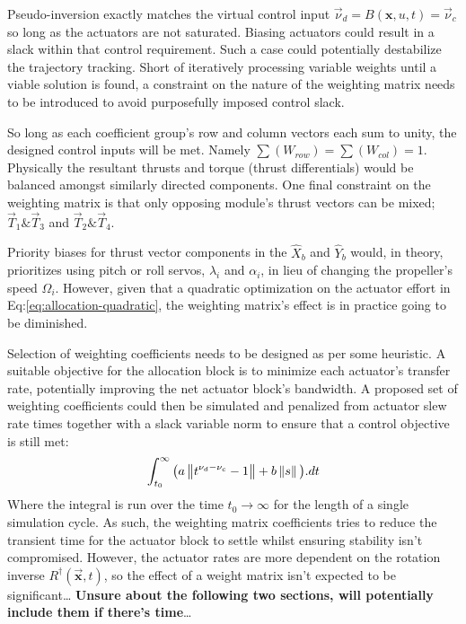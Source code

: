 \par
Pseudo-inversion exactly matches the virtual control input $\vec{\nu}_d=B(\mathbf{x},u,t)=\vec{\nu}_c$ so long as the actuators are not saturated. Biasing actuators could result in a slack within that control requirement. Such a case could potentially destabilize the trajectory tracking. Short of iteratively processing variable weights until a viable solution is found, a constraint on the nature of the weighting matrix needs to be introduced to avoid purposefully imposed control slack.
\par
So long as each coefficient group's row and column vectors each sum to unity, the designed control inputs will be met. Namely $\sum (W_{row})=\sum (W_{col}) = 1$. Physically the resultant thrusts and torque (thrust differentials) would be balanced amongst similarly directed components. One final constraint on the weighting matrix is that only opposing module's thrust vectors can be mixed; $\vec{T}_1\text{\&}\vec{T}_3$ and $\vec{T}_2\text{\&}\vec{T}_4$.
\par
Priority biases for thrust vector components in the $\hat{X}_{b}$ and $\hat{Y}_{b}$ would, in theory, prioritizes using pitch or roll servos, $\lambda_i$ and $\alpha_i$, in lieu of changing the propeller's speed $\Omega_i$. However, given that a quadratic optimization on the actuator effort in Eq:\ref{eq:allocation-quadratic}, the weighting matrix's effect is in practice going to be diminished.
\par
Selection of weighting coefficients needs to be designed as per some heuristic. A suitable objective for the allocation block is to minimize each actuator's transfer rate, potentially improving the net actuator block's bandwidth. A proposed set of weighting coefficients could then be simulated and penalized from actuator slew rate times together with a slack variable norm to ensure that a control objective is still met:
\begin{equation}\label{eq:actuator-penalty}
\int_{t_0}^{\infty} \big(a\left\lVert t^{\nu_d-\nu_c}-1\right\rVert+b\left\lVert s\right\rVert\big).dt
\end{equation}
Where the integral is run over the time $t_0\rightarrow\infty$ for the length of a single simulation cycle. As such, the weighting matrix coefficients tries to reduce the transient time for the actuator block to settle whilst ensuring stability isn't compromised. However, the actuator rates are more dependent on the rotation inverse $R^\dagger(\vec{\mathbf{x}},t)$, so the effect of a weight matrix isn't expected to be significant\ldots
\newpage
\textbf{Unsure about the following two sections, will potentially include them if there's time}\ldots
